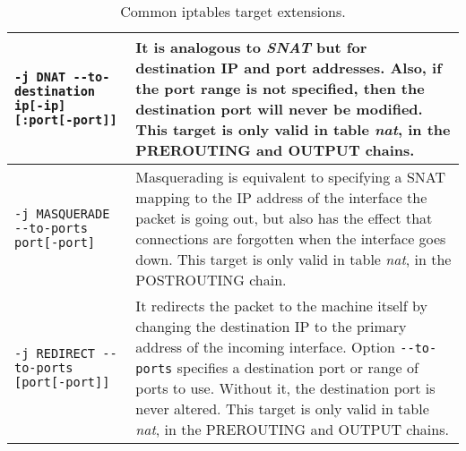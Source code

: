 \begin{table}[htbp]
\begin{tabularx}{\textwidth}[t]{ |X|X| }
    \lstinline{-j DNAT --to-destination ip[-ip][:port[-port]]} &
    It is analogous to \emph{SNAT} but for destination IP and port addresses.
    Also, if the port range is not specified, then the destination port will
    never be modified.
    \newline This target is only valid in table \emph{nat}, in the
    PREROUTING and OUTPUT chains.
    \\ \hline

    \lstinline{-j MASQUERADE --to-ports port[-port]} &
    Masquerading is equivalent to specifying a SNAT mapping to the IP address
    of the interface the packet is going out, but also has the effect that
    connections are forgotten when the interface goes down.
    \newline This target is only valid in table \emph{nat}, in the POSTROUTING
    chain.
    \\ \hline

    \lstinline{-j REDIRECT --to-ports [port[-port]]} &
    It redirects the packet to the machine itself by changing the destination
    IP to the primary address of the incoming interface.  Option
    \lstinline{--to-ports} specifies a destination port or range of ports to
    use.  Without it, the destination port is never altered.
    \newline This target is only valid in table \emph{nat}, in the
    PREROUTING and OUTPUT chains.
    \\ \hline

  \end{tabularx}
  \caption{Common iptables target extensions.}
\end{table}
